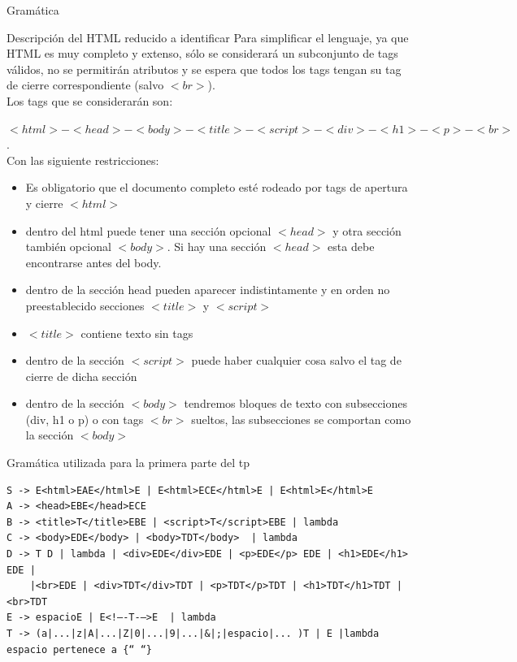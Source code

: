 \documentclass[a4paper,8pt]{article}
\begin{document}
\begin{section}{Gramática}
\begin{subsection}{Descripción del HTML reducido a identificar}
Para simplificar el lenguaje, ya que HTML es muy completo y extenso, sólo se considerará un subconjunto de tags válidos, no se permitirán atributos y se espera que todos los tags tengan su tag de cierre correspondiente (salvo $<br>$).\\


Los tags que se considerarán son:

\textbf{$<html>-<head>-<body>-<title>-<script>-<div>-<h1>-<p>-<br>$}.\\

Con las siguiente restricciones:

\begin{itemize}
 \item Es obligatorio que el documento completo esté rodeado por tags de apertura y cierre $<html>$
\item dentro del html puede tener una sección opcional $<head>$ y otra sección también opcional $<body>$. Si hay una sección $<head>$ esta debe encontrarse antes del body.
\item dentro de la sección head pueden aparecer indistintamente y en orden no preestablecido secciones $<title>$ y $<script>$
\item $<title>$ contiene texto sin tags
\item dentro de la sección $<script>$ puede haber cualquier cosa salvo el tag de cierre de dicha sección
\item dentro de la sección $<body>$ tendremos bloques de texto con subsecciones (div, h1 o p) o con tags $<br>$ sueltos, las subsecciones se comportan como la sección $<body>$
\end{itemize}


\end{subsection}

\begin{subsection}{Gramática utilizada para la primera parte del tp}
\bigskip

\begin{verbatim}
S -> E<html>EAE</html>E | E<html>ECE</html>E | E<html>E</html>E
A -> <head>EBE</head>ECE
B -> <title>T</title>EBE | <script>T</script>EBE | lambda
C -> <body>EDE</body> | <body>TDT</body>  | lambda
D -> T D | lambda | <div>EDE</div>EDE | <p>EDE</p> EDE | <h1>EDE</h1> EDE |
    |<br>EDE | <div>TDT</div>TDT | <p>TDT</p>TDT | <h1>TDT</h1>TDT | <br>TDT
E -> espacioE | E<!–-T-–>E  | lambda 
T -> (a|...|z|A|...|Z|0|...|9|...|&|;|espacio|... )T | E |lambda  
espacio pertenece a {“ “}


\end{verbatim}
\end{subsection}
\end{section}
\end{document}

